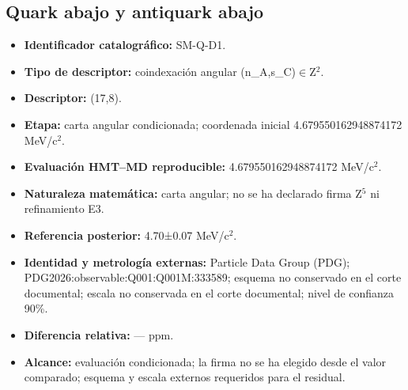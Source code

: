 \subsection{Quark abajo y antiquark abajo}
\begin{itemize}
\item \textbf{Identificador catalográfico:} SM-Q-D1.
\item \textbf{Tipo de descriptor:} coindexación angular (n\_A,s\_C)\(\in\)Z\({}^{2}\).
\item \textbf{Descriptor:} (17,8).
\item \textbf{Etapa:} carta angular condicionada; coordenada inicial 4.679550\allowbreak{}162948\allowbreak{}874172 MeV/c\({}^{2}\).
\item \textbf{Evaluación HMT--MD reproducible:} 4.679550\allowbreak{}162948\allowbreak{}874172 MeV/c\({}^{2}\).
\item \textbf{Naturaleza matemática:} carta angular; no se ha declarado firma Z\({}^{5}\) ni refinamiento E3.
\item \textbf{Referencia posterior:} 4.70±\allowbreak{}0.07 MeV/c\({}^{2}\).
\item \textbf{Identidad y metrología externas:} Particle Data Group (PDG); PDG2026:\allowbreak{}observable:\allowbreak{}Q001:\allowbreak{}Q001M:\allowbreak{}333589; esquema no conservado en el corte documental; escala no conservada en el corte documental; nivel de confianza 90\%.
\item \textbf{Diferencia relativa:} --- ppm.
\item \textbf{Alcance:} evaluación condicionada; la firma no se ha elegido desde el valor comparado; esquema y escala externos requeridos para el residual.
\end{itemize}
